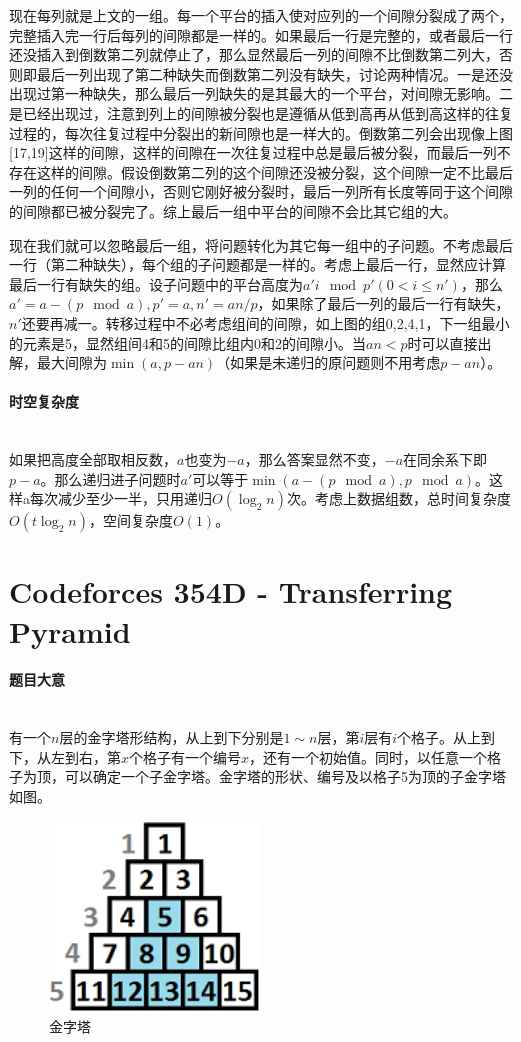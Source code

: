 \documentclass[UTF8]{ctexart}
\newcommand{\myparagraph}[1]{\paragraph{#1}\mbox{}\\}
\theoremstyle{nonumberplain}
\begin{document}
			现在每列就是上文的一组。每一个平台的插入使对应列的一个间隙分裂成了两个，完整插入完一行后每列的间隙都是一样的。如果最后一行是完整的，或者最后一行还没插入到倒数第二列就停止了，那么显然最后一列的间隙不比倒数第二列大，否则即最后一列出现了第二种缺失而倒数第二列没有缺失，讨论两种情况。一是还没出现过第一种缺失，那么最后一列缺失的是其最大的一个平台，对间隙无影响。二是已经出现过，注意到列上的间隙被分裂也是遵循从低到高再从低到高这样的往复过程的，每次往复过程中分裂出的新间隙也是一样大的。倒数第二列会出现像上图[17,19]这样的间隙，这样的间隙在一次往复过程中总是最后被分裂，而最后一列不存在这样的间隙。假设倒数第二列的这个间隙还没被分裂，这个间隙一定不比最后一列的任何一个间隙小，否则它刚好被分裂时，最后一列所有长度等同于这个间隙的间隙都已被分裂完了。综上最后一组中平台的间隙不会比其它组的大。
			
			现在我们就可以忽略最后一组，将问题转化为其它每一组中的子问题。不考虑最后一行（第二种缺失），每个组的子问题都是一样的。考虑上最后一行，显然应计算最后一行有缺失的组。设子问题中的平台高度为$a'i \mod p' (0<i \leq n')$，那么$a'=a-(p \mod a), p'=a, n'=an/p$，如果除了最后一列的最后一行有缺失，$n'$还要再减一。转移过程中不必考虑组间的间隙，如上图的组0,2,4,1，下一组最小的元素是5，显然组间4和5的间隙比组内0和2的间隙小。当$an<p$时可以直接出解，最大间隙为$\min(a,p-an)$（如果是未递归的原问题则不用考虑$p-an$）。
		
		\myparagraph{时空复杂度}
		
			如果把高度全部取相反数，$a$也变为$-a$，那么答案显然不变，$-a$在同余系下即$p-a$。那么递归进子问题时$a'$可以等于$\min(a-(p \mod a), p \mod a)$。这样a每次减少至少一半，只用递归$O(\log_2n)$次。考虑上数据组数，总时间复杂度$O(t\log_2n)$，空间复杂度$O(1)$。
	
	\section{Codeforces 354D - Transferring Pyramid}
	
		\myparagraph{题目大意}
		
			有一个$n$层的金字塔形结构，从上到下分别是$1 \sim n$层，第$i$层有$i$个格子。从上到下，从左到右，第$x$个格子有一个编号$x$，还有一个初始值。同时，以任意一个格子为顶，可以确定一个子金字塔。金字塔的形状、编号及以格子5为顶的子金字塔如图。
			
			\begin{figure}[ht]
				\centering
				\includegraphics[width=0.5\textwidth]{fig354d_1.png}
				\caption{金字塔}
			\end{figure}
			
\end{document}
